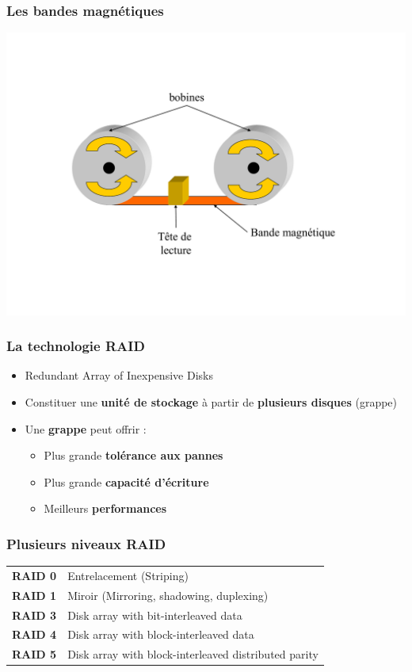 \begin{frame}
\frametitle{Les bandes magnétiques}
\begin{center}
\includegraphics[height=0.8\textheight]{../illustration/bande.pdf}
\end{center}
\end{frame}


\begin{frame}
\frametitle{La technologie RAID}
\begin{itemize}
\item Redundant Array of Inexpensive Disks
\item Constituer une \textbf{unité de stockage} à partir de \textbf{plusieurs disques} (grappe)
\item Une \textbf{grappe} peut offrir :
\begin{itemize}
\item Plus grande \textbf{tolérance aux pannes}
\item Plus grande \textbf{capacité d'écriture}
\item Meilleurs \textbf{performances}
\end{itemize}
\end{itemize}
\end{frame}

\begin{frame}
\frametitle{Plusieurs niveaux RAID}
\begin{tabular}{c|l}
\textbf{RAID 0} & Entrelacement (Striping) \\
\textbf{RAID 1} & Miroir (Mirroring, shadowing, duplexing) \\
\textbf{RAID 3} & Disk array with bit-interleaved data \\
\textbf{RAID 4} & Disk array with block-interleaved data \\
\textbf{RAID 5} & Disk array with block-interleaved distributed parity \\
\end{tabular}
\end{frame}



